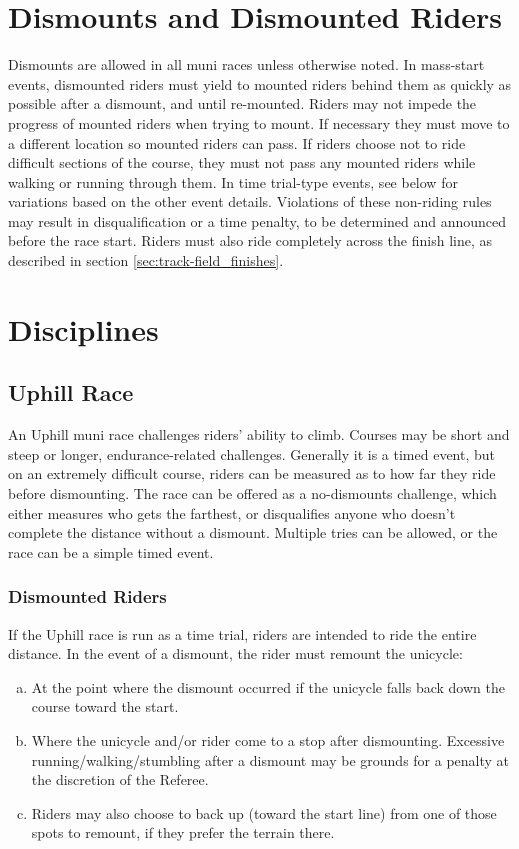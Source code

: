\section{Dismounts and Dismounted Riders}
Dismounts are allowed in all muni races unless otherwise noted.
In mass-start events, dismounted riders must yield to mounted riders behind them as quickly as possible after a dismount, and until re-mounted.
Riders may not impede the progress of mounted riders when trying to mount.
If necessary they must move to a different location so mounted riders can pass.
If riders choose not to ride difficult sections of the course, they must not pass any mounted riders while walking or running through them.
In time trial-type events, see below for variations based on the other event details.
Violations of these non-riding rules may result in disqualification or a time penalty, to be determined and announced before the race start.
Riders must also ride completely across the finish line, as described in section \ref{sec:track-field_finishes}.

\section{Disciplines}

\subsection{Uphill Race}
An Uphill muni race challenges riders' ability to climb.
Courses may be short and steep or longer, endurance-related challenges.
Generally it is a timed event, but on an extremely difficult course, riders can be measured as to how far they ride before dismounting.
The race can be offered as a no-dismounts challenge, which either measures who gets the farthest, or disqualifies anyone who doesn't complete the distance without a dismount.
Multiple tries can be allowed, or the race can be a simple timed event.

\subsubsection{Dismounted Riders}
If the Uphill race is run as a time trial, riders are intended to ride the entire distance.
In the event of a dismount, the rider must remount the unicycle:
\begin{enumerate}[(a)]
\item At the point where the dismount occurred if the unicycle falls back down the course toward the start.
\item Where the unicycle and/or rider come to a stop after dismounting.
Excessive running/walking/stumbling after a dismount may be grounds for a
penalty at the discretion of the Referee.
\item Riders may also choose to back up (toward the start line) from one of those spots to remount, if they prefer the terrain there.
\end{enumerate}


